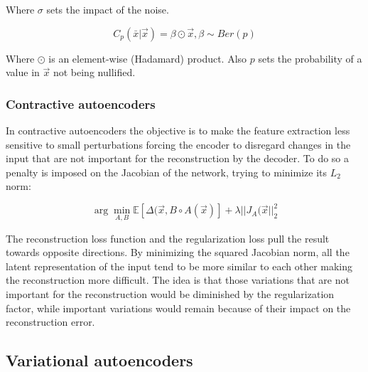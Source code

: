 		Where $\sigma$ sets the impact of the noise.

		$$C_p(\bar{x}|\vec{x}) = \beta\odot\vec{x}, \beta\sim Ber(p)$$

		Where $\odot$ is an element-wise (Hadamard) product.
		Also $p$ sets the probability of a value in $\vec{x}$ not being nullified.

		\subsubsection{Contractive autoencoders}
		In contractive autoencoders the objective is to make the feature extraction less sensitive to small perturbations forcing the encoder to disregard changes in the input that are not important for the reconstruction by the decoder.
		To do so a penalty is imposed on the Jacobian of the network, trying to minimize its $L_2$ norm:

		$$\arg\min\limits_{A,B}\mathbb{E}[\Delta(\vec{x}, B\circ A(\vec{x})] + \lambda||J_A(\vec{x}||_2^2$$

		The reconstruction loss function and the regularization loss pull the result towards opposite directions.
		By minimizing the squared Jacobian norm, all the latent representation of the input tend to be more similar to each other making the reconstruction more difficult.
		The idea is that those variations that are not important for the reconstruction would be diminished by the regularization factor, while important variations would remain because of their impact on the reconstruction error.

	\subsection{Variational autoencoders}
